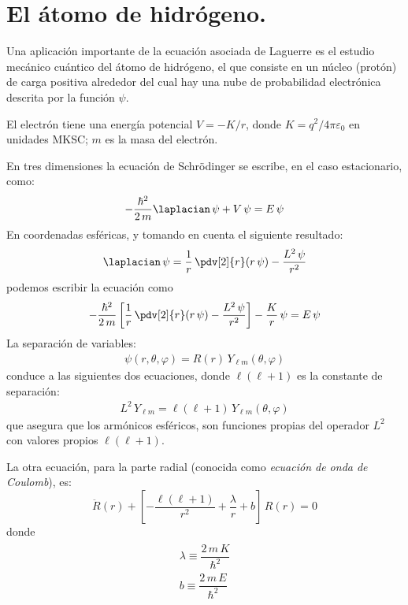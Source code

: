 \section{El átomo de hidrógeno.}
Una aplicación importante de la ecuación asociada de Laguerre es el estudio mecánico cuántico del átomo de hidrógeno, el que consiste en un núcleo (protón) de carga positiva alrededor del cual hay una nube de probabilidad electrónica descrita por la función $\psi$.
\par
El electrón tiene una energía potencial $V = -K /r$, donde $K = q^{2} / 4 \pi \varepsilon_{0}$ en unidades MKSC; $m$ es la masa del electrón.
\par
En tres dimensiones la ecuación de Schrödinger se escribe, en el caso estacionario, como:
\begin{align*}
- \dfrac{\hbar^{2}}{2 \, m} \laplacian \, \psi + V \, \psi = E \, \psi
\end{align*}
En coordenadas esféricas, y tomando en cuenta el siguiente resultado:
\begin{align*}
\laplacian \, \psi = \dfrac{1}{r} \, \pdv[2]{r} (r \, \psi) - \dfrac{L^{2} \, \psi}{r^{2}}
\end{align*}
podemos escribir la ecuación como
\begin{align*}
- \dfrac{\hbar^{2}}{2 \, m} \left[ \dfrac{1}{r} \, \pdv[2]{r} (r \, \psi) - \dfrac{L^{2} \, \psi}{r^{2}} \right] - \dfrac{K}{r} \, \psi = E \, \psi
\end{align*}
La separación de variables:
\begin{align*}
\psi (r, \theta, \varphi) = R(r) \, Y_{\ell m} (\theta, \varphi)
\end{align*}
conduce a las siguientes dos ecuaciones, donde $\ell (\ell +1)$ es la constante de separación:
\begin{align*}
L^{2} \, Y_{\ell m} = \ell (\ell + 1) \, Y_{\ell m} (\theta, \varphi)
\end{align*}
que asegura que los armónicos esféricos, son funciones propias del operador $L^{2}$ con valores propios $\ell (\ell +1)$.
\par
La otra ecuación, para la parte radial (conocida como \emph{ecuación de onda de Coulomb}), es:
\begin{equation}
\ddot{R} (r) + \left[ - \dfrac{\ell (\ell + 1)}{r^{2}} + \dfrac{\lambda}{r} + b \right] \, R (r) = 0
\label{eq:ecuacion_08_82}
\end{equation}
donde
\begin{align}
\begin{aligned}
\lambda \equiv \dfrac{2 \, m \, K}{\hbar^{2}} \\
b \equiv \dfrac{2 \, m \, E}{\hbar^{2}}
 \end{aligned}
\label{eq:ecuacion_08_83}
\end{align}
